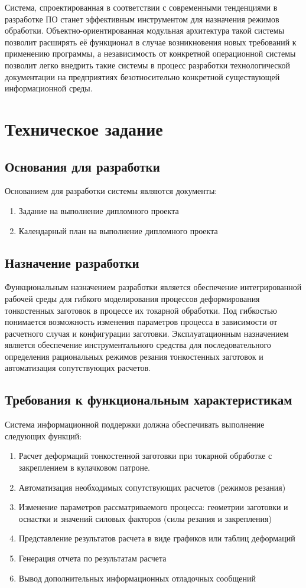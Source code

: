 \documentclass[14pt,oneside,final]{extreport}
\begin{document}
	Система, спроектированная в соответствии с современными тенденциями в разработке ПО станет эффективным инструментом для назначения режимов обработки. Объектно-ориентированная модульная архитектура такой системы позволит расширять её функционал в случае возникновения новых требований к применению программы, а независимость от конкретной операционной системы позволит легко внедрить такие системы в процесс разработки технологической документации на предприятиях безотносительно конкретной существующей информационной среды.
	
	
	\chapter{Техническое задание}	
	
	\section{Основания для разработки}
	Основанием для разработки системы являются документы:
	\begin{enumerate}
	\item Задание на выполнение дипломного проекта
	\item Календарный план на выполнение дипломного проекта
	\end{enumerate}
	
	\section{Назначение разработки}
	Функциональным назначением разработки является обеспечение интегрированной рабочей среды для гибкого моделирования процессов деформирования тонкостенных заготовок в процессе их токарной обработки. Под гибкостью понимается возможность изменения параметров процесса в зависимости от расчетного случая и конфигурации заготовки. Эксплуатационным назначением является обеспечение инструментального средства для последовательного определения рациональных режимов резания тонкостенных заготовок и автоматизация сопутствующих расчетов.
	
	\section{Требования к функциональным характеристикам}
	    Система информационной поддержки должна обеспечивать выполнение следующих функций:
	\begin{enumerate}
	\item Расчет деформаций тонкостенной заготовки при токарной обработке с закреплением в кулачковом патроне.
	\item 	Автоматизация необходимых сопутствующих расчетов (режимов резания)
	\item 	Изменение параметров рассматриваемого процесса: геометрии заготовки  и оснастки и значений силовых факторов (силы резания и закрепления)
	\item 	Представление результатов расчета в виде графиков или таблиц деформаций
	\item 	Генерация отчета по результатам расчета
	\item 	Вывод дополнительных информационных отладочных сообщений 
	\end{enumerate}
\end{document}
